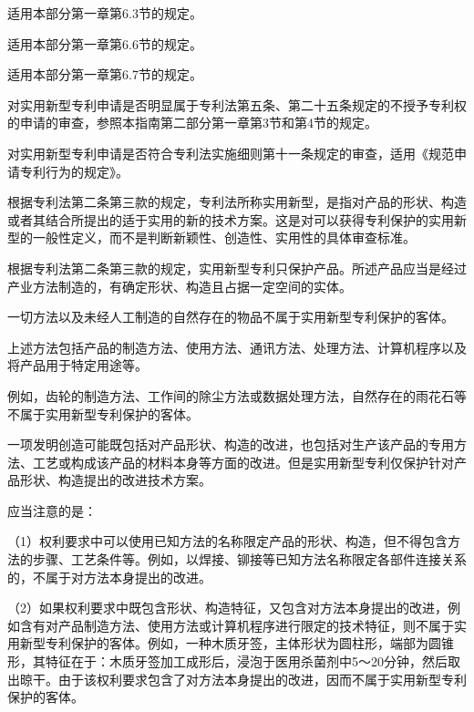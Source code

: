 适用本部分第一章第6.3节的规定。

适用本部分第一章第6.6节的规定。

适用本部分第一章第6.7节的规定。

对实用新型专利申请是否明显属于专利法第五条、第二十五条规定的不授予专利权的申请的审查，参照本指南第二部分第一章第3节和第4节的规定。

对实用新型专利申请是否符合专利法实施细则第十一条规定的审查，适用《规范申请专利行为的规定》。

根据专利法第二条第三款的规定，专利法所称实用新型，是指对产品的形状、构造或者其结合所提出的适于实用的新的技术方案。这是对可以获得专利保护的实用新型的一般性定义，而不是判断新颖性、创造性、实用性的具体审查标准。

根据专利法第二条第三款的规定，实用新型专利只保护产品。所述产品应当是经过产业方法制造的，有确定形状、构造且占据一定空间的实体。

一切方法以及未经人工制造的自然存在的物品不属于实用新型专利保护的客体。

上述方法包括产品的制造方法、使用方法、通讯方法、处理方法、计算机程序以及将产品用于特定用途等。

例如，齿轮的制造方法、工作间的除尘方法或数据处理方法，自然存在的雨花石等不属于实用新型专利保护的客体。

一项发明创造可能既包括对产品形状、构造的改进，也包括对生产该产品的专用方法、工艺或构成该产品的材料本身等方面的改进。但是实用新型专利仅保护针对产品形状、构造提出的改进技术方案。

应当注意的是：

{\setlength{\parindent}{17.1bp}（1）权利要求中可以使用已知方法的名称限定产品的形状、构造，但不得包含方法的步骤、工艺条件等。例如，以焊接、铆接等已知方法名称限定各部件连接关系的，不属于对方法本身提出的改进。\par}

{\setlength{\parindent}{17.1bp}（2）如果权利要求中既包含形状、构造特征，又包含对方法本身提出的改进，例如含有对产品制造方法、使用方法或计算机程序进行限定的技术特征，则不属于实用新型专利保护的客体。例如，一种木质牙签，主体形状为圆柱形，端部为圆锥形，其特征在于：木质牙签加工成形后，浸泡于医用杀菌剂中5～20分钟，然后取出晾干。由于该权利要求包含了对方法本身提出的改进，因而不属于实用新型专利保护的客体。\par}

